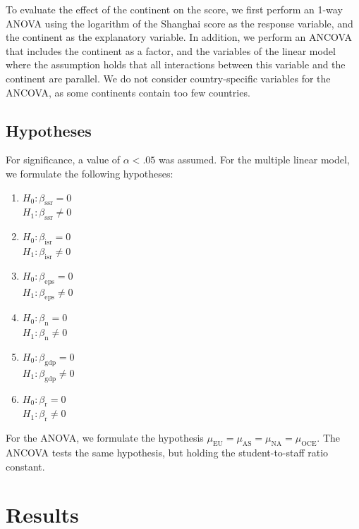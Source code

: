 \documentclass{stats_apa_style2}
\begin{document}
To evaluate the effect of the continent on the score, we first perform an 1-way
ANOVA using the logarithm of the Shanghai score as the response variable, and
the continent as the explanatory variable. In addition, we perform an ANCOVA
that includes the continent as a factor, and the variables of the linear model
where the assumption holds that all interactions between this variable and the
continent are parallel. We do not consider country-specific variables for the
ANCOVA, as some continents contain too few countries.

\subsection*{Hypotheses} 
\label{Hypotheses}

For significance, a value of $\alpha < .05$ was assumed. For the multiple linear model, we formulate the following hypotheses:

\begin{enumerate}
\item $H_0: \beta_\mathrm{ssr} = 0 $\\ $H_1: \beta_\mathrm{ssr} \ne 0  $
\item $H_0: \beta_\mathrm{isr} = 0 $\\ $H_1: \beta_\mathrm{isr} \ne 0  $
\item $H_0: \beta_\mathrm{eps} = 0 $\\ $H_1: \beta_\mathrm{eps} \ne 0  $
\item $H_0: \beta_\mathrm{n} = 0 $\\ $H_1: \beta_\mathrm{n} \ne 0  $
\item $H_0: \beta_\mathrm{gdp} = 0 $\\ $H_1: \beta_\mathrm{gdp} \ne 0  $
\item $H_0: \beta_\mathrm{r} = 0 $\\ $H_1: \beta_\mathrm{r} \ne 0  $
\end{enumerate}

For the ANOVA, we formulate the hypothesis $\mu_\mathrm{EU} = \mu_\mathrm{AS} = \mu_\mathrm{NA} = \mu_\mathrm{OCE}$. The ANCOVA tests the same hypothesis, but holding the student-to-staff ratio constant.

\section*{Results}
\label{Results}
\end{document}
